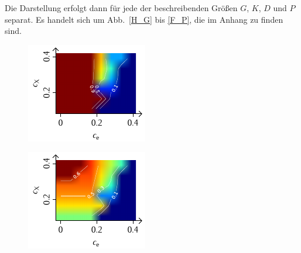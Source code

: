 \documentclass[a4paper, 10pt, twoside, openany]{book} %
\begin{document}
	Die Darstellung erfolgt dann für jede der beschreibenden Größen $G$, $K$, $D$ und $P$ separat. Es handelt sich um Abb.~\ref{H_G} bis \ref{F_P}, die im Anhang zu finden sind.
	
	\begin{figure}[b]
		\begin{minipage}[t]{0.31\textwidth}
			\includegraphics[width=\textwidth]{Abbildungen/Phasendiagramme/Exakt/H_G.pdf}
			\label{HGx}
		\end{minipage}
		\hfill
		\begin{minipage}[t]{0.31\textwidth}
			\includegraphics[width=\textwidth]{Abbildungen/Phasendiagramme/Exakt/H_K.pdf}

\end{minipage}
\end{figure}
\end{document}
